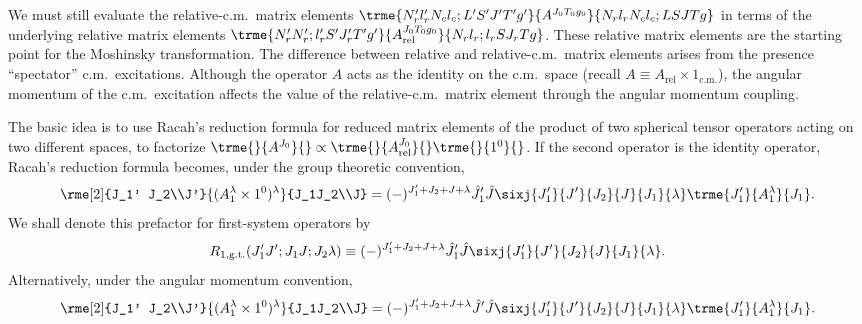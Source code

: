 \documentclass[aps,groupedaddress,onecolumn,11pt,floatfix]{revtex4}
\newcommand{\mathds}{}
\newcommand{\Arel}{A_\text{rel}}
\newcommand{\Nr}{N_r}
\newcommand{\Nc}{N_c}
\newcommand{\lr}{l_r}
\newcommand{\lc}{l_c}
\newcommand{\Jr}{J_r}
\newcommand{\unity}{\mathds{1}}
\newcommand{\unitycm}{{\mathds{1}_{\text{c.m.}}}}
\begin{document}
We must still evaluate the relative-c.m.~matrix elements $\trme{\Nr'
  \lr' \Nc \lc;L'S'J'T'g'}{A^{J_0T_0g_0}}{\Nr \lr \Nc \lc; LSJTg}$ in
terms of the underlying relative matrix elements $\trme{\Nr' \Nr'
  ;\lr' S'\Jr'T'g'}{\Arel^{J_0T_0g_0}}{\Nr \lr; \lr S\Jr Tg}$.  These
relative matrix elements are the starting point for the Moshinsky
transformation.  The difference between relative and
relative-c.m.~matrix elements arises from the presence ``spectator''
c.m.~excitations.  Although the operator $A$ acts as the identity on
the c.m.~space (recall $A\equiv\Arel\times\unitycm$), the angular
momentum of the c.m.~excitation affects the value of the
relative-c.m.~matrix element through the angular momentum coupling.

The basic idea is to use
Racah's reduction formula for reduced matrix elements of the product
of two spherical tensor operators acting on two different spaces, to
factorize $\trme{}{A^{J_0}}{}\propto\trme{}{\Arel^{J_0}}{}\trme{}{\unity^{0}}{}$.
If the second operator is the
identity operator, Racah's reduction formula becomes, under the group theoretic convention, 
\begin{equation}
\rme[2]{J_1' J_2\\J'}{(A_1^{\lambda}\times\unity^0)^\lambda}{J_1J_2\\J}
=(-)^{J_1'+J_2+J+\lambda}\hat{J}_1'\hat{J}\sixj{J_1'}{J'}{J_2}{J}{J_1}{\lambda}
\trme{J_1'}{A_1^\lambda}{J_1}.
\end{equation}
We shall denote this prefactor for first-system operators by
\begin{equation}
R_{1,\text{g.t.}}(J_1'J';J_1J;J_2\lambda)\equiv(-)^{J_1'+J_2+J+\lambda}\hat{J}_1'\hat{J}\sixj{J_1'}{J'}{J_2}{J}{J_1}{\lambda}.
\end{equation}
Alternatively, under the angular momentum convention,
\begin{equation}
\rme[2]{J_1' J_2\\J'}{(A_1^{\lambda}\times\unity^0)^\lambda}{J_1J_2\\J}
=(-)^{J_1'+J_2+J+\lambda}\hat{J}'\hat{J}\sixj{J_1'}{J'}{J_2}{J}{J_1}{\lambda}
\trme{J_1'}{A_1^\lambda}{J_1}.
\end{equation}
\end{document}

